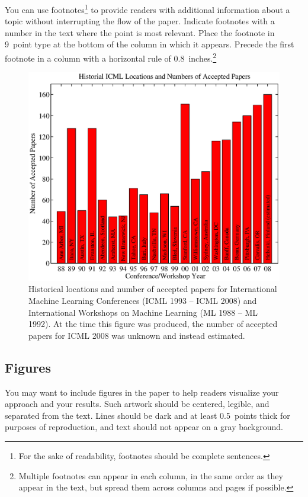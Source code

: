 \documentclass{article}
\begin{document}
You can use footnotes\footnote{For the sake of readability, footnotes
should be complete sentences.} to provide readers with additional
information about a topic without interrupting the flow of the paper. 
Indicate footnotes with a number in the text where the point is most
relevant. Place the footnote in 9~point type at the bottom of the
column in which it appears. Precede the first footnote in a column
with a horizontal rule of 0.8~inches.\footnote{Multiple footnotes can
appear in each column, in the same order as they appear in the text,
but spread them across columns and pages if possible.}

\begin{figure}[ht]
\vskip 0.2in
\begin{center}
\centerline{\includegraphics[width=\columnwidth]{icml_numpapers}}
\caption{Historical locations and number of accepted papers for International
  Machine Learning Conferences (ICML 1993 -- ICML 2008) and
  International Workshops on Machine Learning (ML 1988 -- ML
  1992). At the time this figure was produced, the number of
  accepted papers for ICML 2008 was unknown and instead estimated.}
\label{icml-historical}
\end{center}
\vskip -0.2in
\end{figure} 

\subsection{Figures}
 
You may want to include figures in the paper to help readers visualize
your approach and your results. Such artwork should be centered,
legible, and separated from the text. Lines should be dark and at
least 0.5~points thick for purposes of reproduction, and text should
not appear on a gray background.
\end{document}
